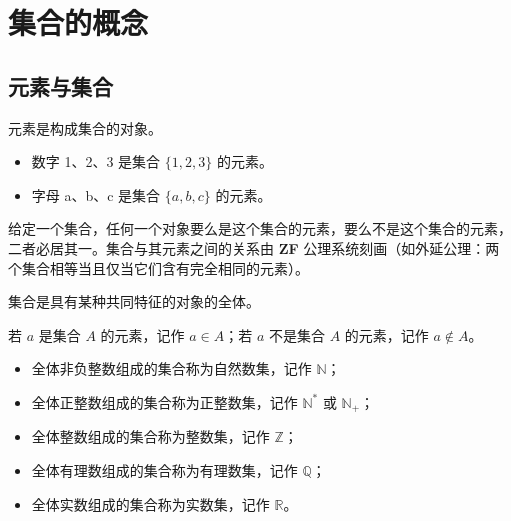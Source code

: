 
\section{集合的概念}
\subsection{元素与集合}
\begin{definition}[元素]
元素是构成集合的对象。
\begin{example}
    \begin{itemize}
        \item 数字 1、2、3 是集合 $\{1,2,3\}$ 的元素。
        \item 字母 a、b、c 是集合 $\{a,b,c\}$ 的元素。
    \end{itemize}
\end{example}
\end{definition}
\begin{axiom}[集合的确定性]
给定一个集合，任何一个对象要么是这个集合的元素，要么不是这个集合的元素，二者必居其一。集合与其元素之间的关系由 \textbf{ZF} 公理系统刻画（如外延公理：两个集合相等当且仅当它们含有完全相同的元素）。
\end{axiom}
\begin{definition}[集合]
集合是具有某种共同特征的对象的全体。
\end{definition}

\begin{definition}[元素与集合的关系]
若 $a$ 是集合 $A$ 的元素，记作 $a \in A$；若 $a$ 不是集合 $A$ 的元素，记作 $a \notin A$。
\end{definition}
\begin{definition}[常用数集]
\begin{itemize}
    \item 全体非负整数组成的集合称为自然数集，记作 $\mathbb{N}$；
    \item 全体正整数组成的集合称为正整数集，记作 $\mathbb{N}^*$ 或 $\mathbb{N}_+$；
    \item 全体整数组成的集合称为整数集，记作 $\mathbb{Z}$；
    \item 全体有理数组成的集合称为有理数集，记作 $\mathbb{Q}$；
    \item 全体实数组成的集合称为实数集，记作 $\mathbb{R}$。
\end{itemize}
\end{definition}
